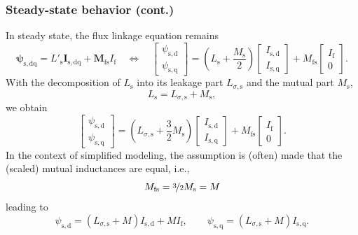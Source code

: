 \begin{frame}
	\frametitle{Steady-state behavior (cont.)}
	In steady state, the flux linkage equation remains
	$$\bm{\psi}_\mathrm{s,dq} =  L'_\mathrm{s} \bm{I}_\mathrm{s,dq} + \bm{M}_\mathrm{fs} I_{\mathrm{f}} \quad \Leftrightarrow \quad \begin{bmatrix}
		\psi_\mathrm{s,d} \\ \psi_\mathrm{s,q}
	\end{bmatrix} = \left(L_\mathrm{s} +\frac{M_\mathrm{s}}{2}\right)\begin{bmatrix}
		I_\mathrm{s,d} \\ I_\mathrm{s,q}
	\end{bmatrix} + M_\mathrm{fs} \begin{bmatrix}
		I_\mathrm{f} \\ 0
	\end{bmatrix}.$$
	\pause
	With the decomposition of $L_\mathrm{s}$ into its leakage part $L_{\sigma,\mathrm{s}}$ and the mutual part $M_\mathrm{s}$, 
	\begin{equation}
		L_\mathrm{s} = L_{\sigma,\mathrm{s}} + M_{\mathrm{s}}, 
	\end{equation}
	\pause
	we obtain
	\begin{equation}
		\begin{bmatrix}
			\psi_\mathrm{s,d} \\ \psi_\mathrm{s,q}
		\end{bmatrix} = \left(L_{\sigma,\mathrm{s}} + \frac{3}{2}M_\mathrm{s}\right)\begin{bmatrix}
			I_\mathrm{s,d} \\ I_\mathrm{s,q}
		\end{bmatrix} + M_\mathrm{fs} \begin{bmatrix}
			I_\mathrm{f} \\ 0
		\end{bmatrix}.
		\end{equation}
		\pause
	In the context of simplified modeling, the assumption is (often) made that the (scaled) mutual inductances are equal, i.e., 
	$$M_\mathrm{fs} = \nicefrac{3}{2} M_\mathrm{s} = M$$ 
	\pause 
	leading to
	\begin{equation}
			\psi_\mathrm{s,d} = \left(L_{\sigma,\mathrm{s}} + M\right)I_\mathrm{s,d} + M I_\mathrm{f}, \qquad \psi_\mathrm{s,q} = \left(L_{\sigma,\mathrm{s}} + M\right)I_\mathrm{s,q}.
			\label{eq:SM_stator_flux_linkage_steady_state}
	\end{equation}
\end{frame}

